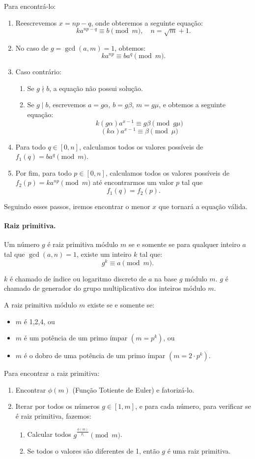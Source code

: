 Para encontrá-lo:
\begin{enumerate}
    \item Reescrevemos $x=np-q$, onde obteremos a seguinte equação:
    $$ka^{np-q} \equiv b \pmod{m}, \quad n = \sqrt{m}+1.$$
    \item No caso de $g = \gcd(a,m) = 1$, obtemos:
    $$ka^{np} \equiv ba^q \pmod{m}.$$
    \item Caso contrário:
    \begin{enumerate}
        \item Se $g \nmid b$, a equação não possui solução.
        \item Se $g \mid b$, escrevemos $a=g\alpha$, $b=g\beta$, $m=g\mu$, e obtemos a seguinte equação:
        $$k(g\alpha)a^{x-1} \equiv g\beta \pmod{g\mu}$$
        $$(k\alpha)a^{x-1} \equiv \beta \pmod{\mu}$$
    \end{enumerate}
    \item Para todo $q \in [0,n]$, calculamos todos os valores possíveis de $f_1(q) = ba^q \pmod{m}$.
    \item Por fim, para todo $p \in [0,n]$, calculamos todos os valores possíveis de $f_2(p) = ka^{np} \pmod{m}$ até encontrarmos um valor $p$ tal que
    $$f_1(q) = f_2(p).$$
\end{enumerate}

Seguindo esses passos, iremos encontrar o menor $x$ que tornará a equação válida.

\paragraph{Raiz primitiva.} Um número $g$ é raiz primitiva módulo $m$ se e somente se para qualquer inteiro $a$ tal que $\gcd(a,n) = 1$, existe um inteiro $k$ tal que:
$$g^k \equiv a \pmod m.$$

$k$ é chamado de índice ou logaritmo discreto de $a$ na base $g$ módulo $m$. $g$ é chamado de generador do grupo multiplicativo dos inteiros módulo $m$.

A raiz primitiva módulo $m$ existe se e somente se:
\begin{itemize}
    \item $m$ é 1,2,4, ou
    \item $m$ é um potência de um primo ímpar $(m = p^k)$, ou
    \item $m$ é o dobro de uma potência de um primo ímpar $(m = 2\cdot p^k)$.
\end{itemize}

Para encontrar a raiz primitiva:
\begin{enumerate}
    \item Encontrar $\phi(m)$ (Função Totiente de Euler) e fatorizá-lo.
    \item Iterar por todos os números $g \in [1,m]$, e para cada número, para verificar se é raiz primitiva, fazemos:
    \begin{enumerate}
        \item Calcular todos $g^{\frac{\phi(m)}{p_i}} \pmod m$.
        \item Se todos o valores são diferentes de 1, então $g$ é uma raiz primitiva.
    \end{enumerate} 
\end{enumerate}


